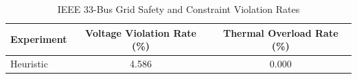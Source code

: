\begin{table}[h]
\centering
\caption{IEEE 33-Bus Grid Safety and Constraint Violation Rates}
\label{table:grid_safety}
\begin{tabular}{lcc}
\hline
Experiment & Voltage Violation Rate (\%) & Thermal Overload Rate (\%) \\
\hline
Heuristic & 4.586 & 0.000 \\
\hline
\end{tabular}
\end{table}
